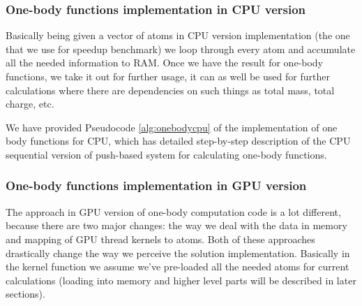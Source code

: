 \documentclass[12pt,letterpaper]{report}
\begin{document}
\subsubsection{One-body functions implementation in CPU version}

\hspace{3em} Basically being given a vector of atoms in CPU version implementation (the one that we use for speedup benchmark) we loop through every atom and accumulate all the needed information to RAM. Once we have the result for one-body functions, we take it out for further usage, it can as well be used for further calculations where there are dependencies on such things as total mass, total charge, etc.

We have provided Pseudocode \ref{alg:onebodycpu} of the implementation of one body functions for CPU, which has detailed step-by-step description of the CPU sequential version of push-based system for calculating one-body functions.

\subsubsection{One-body functions implementation in GPU version}

\hspace{3em} The approach in GPU version of one-body computation code is a lot different, because there are two major changes: the way we deal with the data in memory and mapping of GPU thread kernels to atoms. Both of these approaches drastically change the way we perceive the solution implementation. Basically in the kernel function we assume we've pre-loaded all the needed atoms for current calculations (loading into memory and higher level parts will be described in later sections).
\end{document}
